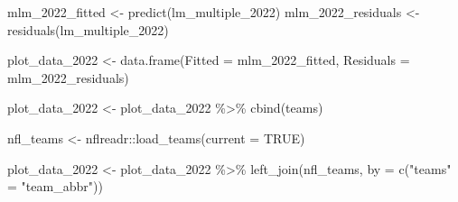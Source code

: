 \documentclass[
  letterpaper,
]{krantz}
\newenvironment{Shaded}{\begin{snugshade}}{\end{snugshade}}
\newcommand{\AttributeTok}[1]{\textcolor[rgb]{0.40,0.45,0.13}{#1}}
\newcommand{\ConstantTok}[1]{\textcolor[rgb]{0.56,0.35,0.01}{#1}}
\newcommand{\FunctionTok}[1]{\textcolor[rgb]{0.28,0.35,0.67}{#1}}
\newcommand{\NormalTok}[1]{\textcolor[rgb]{0.00,0.23,0.31}{#1}}
\newcommand{\OtherTok}[1]{\textcolor[rgb]{0.00,0.23,0.31}{#1}}
\newcommand{\SpecialCharTok}[1]{\textcolor[rgb]{0.37,0.37,0.37}{#1}}
\newcommand{\StringTok}[1]{\textcolor[rgb]{0.13,0.47,0.30}{#1}}
\begin{document}
\begin{Shaded}
\begin{Highlighting}[]
\NormalTok{mlm\_2022\_fitted }\OtherTok{\textless{}{-}} \FunctionTok{predict}\NormalTok{(lm\_multiple\_2022)}
\NormalTok{mlm\_2022\_residuals }\OtherTok{\textless{}{-}} \FunctionTok{residuals}\NormalTok{(lm\_multiple\_2022)}

\NormalTok{plot\_data\_2022 }\OtherTok{\textless{}{-}} \FunctionTok{data.frame}\NormalTok{(}\AttributeTok{Fitted =}\NormalTok{ mlm\_2022\_fitted,}
                             \AttributeTok{Residuals =}\NormalTok{ mlm\_2022\_residuals)}

\NormalTok{plot\_data\_2022 }\OtherTok{\textless{}{-}}\NormalTok{ plot\_data\_2022 }\SpecialCharTok{\%\textgreater{}\%}
  \FunctionTok{cbind}\NormalTok{(teams)}

\NormalTok{nfl\_teams }\OtherTok{\textless{}{-}}\NormalTok{ nflreadr}\SpecialCharTok{::}\FunctionTok{load\_teams}\NormalTok{(}\AttributeTok{current =} \ConstantTok{TRUE}\NormalTok{)}

\NormalTok{plot\_data\_2022 }\OtherTok{\textless{}{-}}\NormalTok{ plot\_data\_2022 }\SpecialCharTok{\%\textgreater{}\%}
  \FunctionTok{left\_join}\NormalTok{(nfl\_teams, }\AttributeTok{by =} \FunctionTok{c}\NormalTok{(}\StringTok{"teams"} \OtherTok{=} \StringTok{"team\_abbr"}\NormalTok{))}


\end{Highlighting}
\end{Shaded}
\end{document}
